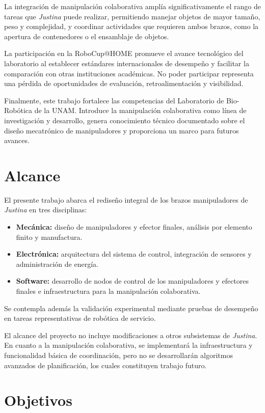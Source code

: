 La integración de manipulación colaborativa amplía significativamente el rango de tareas que \emph{Justina} puede realizar, permitiendo manejar objetos de mayor tamaño, peso y complejidad, y coordinar actividades que requieren ambos brazos, como la apertura de contenedores o el ensamblaje de objetos.

La participación en la RoboCup@HOME promueve el avance tecnológico del laboratorio al establecer estándares internacionales de desempeño y facilitar la comparación con otras instituciones académicas. No poder participar representa una pérdida de oportunidades de evaluación, retroalimentación y visibilidad.

Finalmente, este trabajo fortalece las competencias del Laboratorio de Bio-Robótica de la UNAM. Introduce la manipulación colaborativa como línea de investigación y desarrollo, genera conocimiento técnico documentado sobre el diseño mecatrónico de manipuladores y proporciona un marco para futuros avances.

\section{Alcance}

El presente trabajo abarca el rediseño integral de los brazos manipuladores de \emph{Justina} en tres disciplinas:

\begin{itemize}
    \item \textbf{Mecánica:} diseño de manipuladores y efector finales, análisis por elemento finito y manufactura.
    \item \textbf{Electrónica:} arquitectura del sistema de control, integración de sensores y administración de energía.
    \item \textbf{Software:} desarrollo de nodos de control de los manipuladores y efectores finales e infraestructura para la manipulación colaborativa.
\end{itemize}

Se contempla además la validación experimental mediante pruebas de desempeño en tareas representativas de robótica de servicio.

El alcance del proyecto no incluye modificaciones a otros subsistemas de \emph{Justina}. En cuanto a la manipulación colaborativa, se implementará la infraestructura y funcionalidad básica de coordinación, pero no se desarrollarán algoritmos avanzados de planificación, los cuales constituyen trabajo futuro.

\section{Objetivos}

